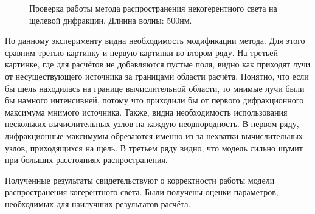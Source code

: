 \begin{figure}[htbp]
	\caption{Проверка работы метода распространения некогерентного света на щелевой дифракции. Длинна волны: $500$нм.}
	\label{ris:PropagationSlit}
\end{figure}
По данному эксперименту видна необходимость модификации метода. Для этого сравним третью картинку и первую картинки во втором ряду. На третьей картинке, где для расчётов не добавляются пустые поля, видно как приходят лучи от несуществующего источника за границами области расчёта. Понятно, что если бы щель находилась на границе вычислительной области, то мнимые лучи были бы намного интенсивней, потому что приходили бы от первого дифракционного максимума мнимого источника. Также, видна необходимость использования нескольких вычислительных узлов на каждую неоднородность. В первом ряду, дифракционные максимумы обрезаются именно из-за нехватки вычислительных узлов, приходящихся на щель. В третьем ряду видно, что модель сильно шумит при больших расстояниях распространения.
\par
Полученные результаты свидетельствуют о корректности работы модели распространения когерентного света. Были получены оценки параметров, необходимых для наилучших результатов расчёта.



